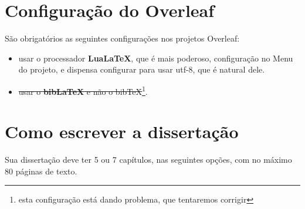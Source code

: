 \documentclass{article}
\begin{document}
\section{Configuração do Overleaf}    
    
     São obrigatórios as seguintes configurações nos projetos Overleaf:
    \begin{itemize}

        \item usar o processador \textbf{LuaLaTeX}, que é mais poderoso, configuração no Menu do projeto, e dispensa configurar para usar utf-8, que é natural dele.
        \item \sout{usar o \textbf{bibLaTeX} e não o bibTeX}\footnote{ esta configuração está dando problema, que tentaremos corrigir}.
    
\end{itemize}


\section{Como escrever a dissertação}

Sua dissertação deve ter 5 ou 7 capítulos, nas seguintes opções, com no máximo 80 páginas de texto.
\end{document}
